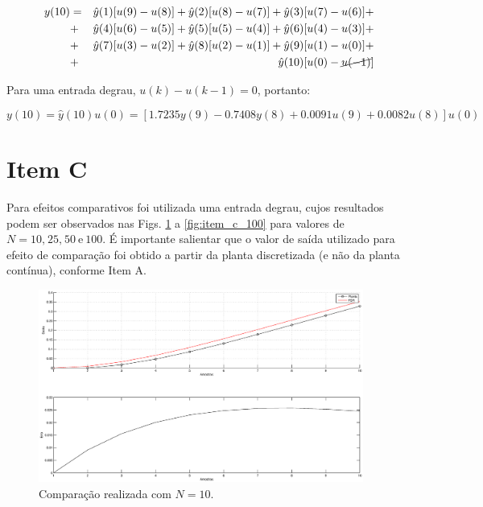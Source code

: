 \begin{eqnarray}
y(10) & = & \hat{y}(1)[u(9)-u(8)] + 
            \hat{y}(2)[u(8)-u(7)] + 
            \hat{y}(3)[u(7)-u(6)] + \nonumber\\
      & + & \hat{y}(4)[u(6)-u(5)] +
            \hat{y}(5)[u(5)-u(4)] +
            \hat{y}(6)[u(4)-u(3)] + \nonumber\\
      & + & \hat{y}(7)[u(3)-u(2)] +
            \hat{y}(8)[u(2)-u(1)] +
            \hat{y}(9)[u(1)-u(0)] + \nonumber\\
      & + & \hat{y}(10)[u(0)-\cancel{u(-1)}] \nonumber
\end{eqnarray}

Para uma entrada degrau, $u(k) - u(k-1) = 0$, portanto:

\begin{equation}
y(10) = \hat{y}(10)u(0) = 
        [1.7235y(9) - 0.7408y(8) + 0.0091u(9) + 0.0082u(8)]u(0)
\end{equation}

\section*{Item C}
Para efeitos comparativos foi utilizada uma entrada degrau, cujos resultados
podem ser observados nas Figs. \ref{fig:item_c_10} a \ref{fig:item_c_100} para
valores de $N = 10\text{,}\ 25\text{,}\ 50\ \text{e}\ 100$. É importante
salientar que o valor de saída utilizado para efeito de comparação foi obtido a
partir da planta discretizada (e não da planta contínua), conforme Item A.

\begin{figure}[H]
\centering
    \includegraphics[width=0.95\textwidth]{imgs/questao1/item_c_N_10}
    \caption{Comparação realizada com $N = 10$.}
    \label{fig:item_c_10}
\end{figure}
    
